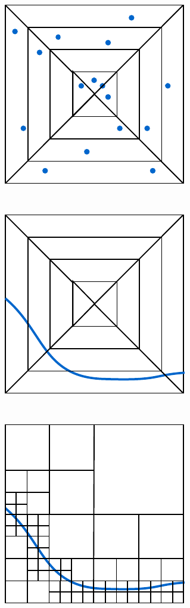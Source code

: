 \begin{figure}
	\begin{center}
		\begin{subfloat}{%
			\includegraphics[scale=0.65]{figures/non_continuous_pyramid.pdf}
		}
		\end{subfloat}~~~~~
		\begin{subfloat}{%
			\includegraphics[scale=0.65]{figures/1d_manifold_pyramid.pdf}
		}
		\end{subfloat}~~~~~
		\begin{subfloat}{%
			\includegraphics[scale=0.65]{figures/1d_manifold_octree.pdf}
		}

\end{subfloat}
\end{center}
\end{figure}
